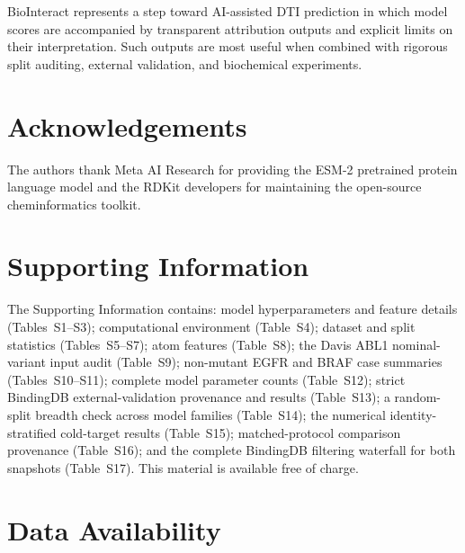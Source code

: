 \documentclass[fleqn,10pt]{wlscirep}
\begin{document}
BioInteract represents a step toward AI-assisted DTI prediction in which model
scores are accompanied by transparent attribution outputs and explicit limits on
their interpretation.  Such outputs are most useful when combined with rigorous
split auditing, external validation, and biochemical experiments.

\section*{Acknowledgements}

The authors thank Meta AI Research for providing the ESM-2 pretrained protein
language model and the RDKit developers for maintaining the open-source
cheminformatics toolkit.

\section*{Supporting Information}

The Supporting Information contains: model hyperparameters and feature details
(Tables~S1--S3); computational environment (Table~S4); dataset and split
statistics (Tables~S5--S7); atom features (Table~S8); the Davis ABL1
nominal-variant input audit (Table~S9); non-mutant EGFR and BRAF case summaries
(Tables~S10--S11); complete model parameter counts (Table~S12); strict
BindingDB external-validation provenance and results (Table~S13);
\begingroup\color{red}
a random-split breadth check across model families
(Table~S14); the numerical identity-stratified cold-target results
(Table~S15); matched-protocol comparison provenance (Table~S16); and the
complete BindingDB filtering waterfall for both snapshots (Table~S17).
\endgroup
This material is available free of charge.

\section*{Data Availability}
\end{document}
